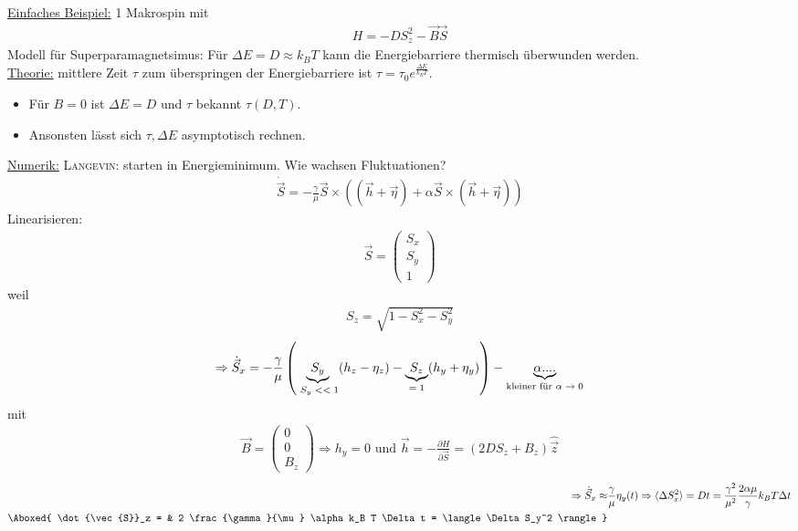 \documentclass[12pt]{article}
\begin{document}
   \underline{Einfaches Beispiel:} 1 Makrospin mit 
   \begin{align*}
   H = -D S_z^2 - \vec{B} \vec{S}
   \end{align*}
   Modell für Superparamagnetsimus: Für $\Delta E = D \approx k_B T$ kann die Energiebarriere thermisch überwunden werden. \\
   \underline{Theorie:} mittlere Zeit $\tau$ zum überspringen der Energiebarriere ist $\tau = \tau_0 e^\frac{\Delta E}{k_B T}$. \begin{itemize}
   \item Für $B=0$ ist $\Delta E = D$ und $\tau $ bekannt $\tau (D, T)$. 
    \item Ansonsten lässt sich $\tau, \Delta E$ asymptotisch rechnen.
    \end{itemize}
    \underline{Numerik:} \textsc{Langevin:} starten in Energieminimum. Wie wachsen Fluktuationen?
    \begin{align}
    \dot{\vec{S}} = - \frac{\gamma}{\mu} \vec{S} \times \left( ( \vec{h} +  \vec{\eta}) + \alpha  \vec{S} \times ( \vec{h} +  \vec{\eta}) \right)
    \end{align}
    Linearisieren:
    \begin{align}
     \vec{S} = \begin{pmatrix}S_x\\ S_y \\ 1 \end{pmatrix}
    \end{align}
    weil 
    \begin{align}
    S_z = \sqrt{1- S_x^2 - S_y^2}
    \end{align}
    \begin{align}
    \Rightarrow \dot{\vec{S}}_x = - \frac{\gamma }{\mu} \left(
    \underbrace{ S_y}_\text{ $S_y <<1$} ( h_z - \eta_z ) - \underbrace{S_z}_\text{$=1$} (h_y + \eta_y) \right) - \underbrace{\alpha....}_\text{kleiner für $ \alpha \to 0$}
    \end{align}
    mit
    \begin{align}
    \vec{B} = \begin{pmatrix} 0 \\ 0 \\ B_z \end{pmatrix} \Rightarrow h_y = 0 \mbox{ und } \vec{h}= - \frac{\partial H}{\partial \vec{S}}= (2 DS_z + B_z) \hat{\vec{z}}
    \end{align}
    \begin{align}
    \Rightarrow \dot{\vec{S}}_x \approx & \frac{\gamma}{\mu} \eta_y (t) \Rightarrow \langle \Delta S_x^2 \rangle = Dt = \frac{\gamma ^2}{\mu ^2} \frac{2 \alpha \mu }{\gamma} k_B T \Delta t \\
   \Aboxed{  \dot{\vec{S}}_z = & 2 \frac{\gamma}{\mu} \alpha k_B T \Delta t = \langle \Delta S_y^2 \rangle}
    \end{align}
\end{document}
